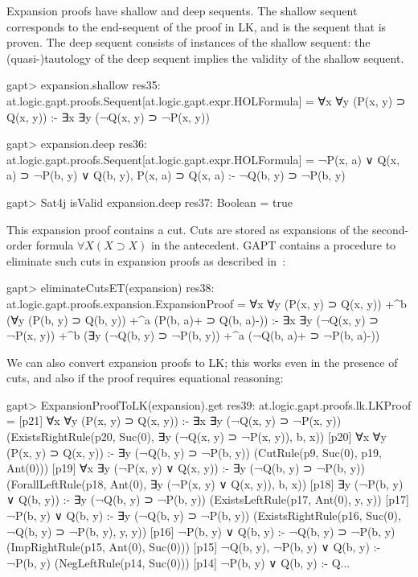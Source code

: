 \documentclass[a4paper,11pt]{article}
\newcommand{\impl}{\supset} %
\begin{document}
Expansion proofs have shallow and deep sequents.  The shallow sequent
corresponds to the end-sequent of the proof in LK, and is the sequent that is
proven.  The deep sequent consists of instances of the shallow sequent: the
(quasi-)tautology of the deep sequent implies the validity of the shallow
sequent.
\begin{clilisting}
gapt> expansion.shallow
res35: at.logic.gapt.proofs.Sequent[at.logic.gapt.expr.HOLFormula] = ∀x ∀y (P(x, y) ⊃ Q(x, y)) :- ∃x ∃y (¬Q(x, y) ⊃ ¬P(x, y))

gapt> expansion.deep
res36: at.logic.gapt.proofs.Sequent[at.logic.gapt.expr.HOLFormula] =
¬P(x, a) ∨ Q(x, a) ⊃ ¬P(b, y) ∨ Q(b, y),
P(x, a) ⊃ Q(x, a)
:-
¬Q(b, y) ⊃ ¬P(b, y)

gapt> Sat4j isValid expansion.deep
res37: Boolean = true

\end{clilisting}

This expansion proof contains a cut.  Cuts are stored as expansions of the
second-order formula $\forall X (X \impl X)$ in the antecedent.  GAPT contains
a procedure to eliminate such cuts in expansion proofs as described
in~\cite{Hetzl2013Expansion}:
\begin{clilisting}
gapt> eliminateCutsET(expansion)
res38: at.logic.gapt.proofs.expansion.ExpansionProof =
∀x ∀y (P(x, y) ⊃ Q(x, y))
  +^{b} (∀y (P(b, y) ⊃ Q(b, y)) +^{a} (P(b, a)+ ⊃ Q(b, a)-))
:-
∃x ∃y (¬Q(x, y) ⊃ ¬P(x, y))
  +^{b} (∃y (¬Q(b, y) ⊃ ¬P(b, y)) +^{a} (¬Q(b, a)+ ⊃ ¬P(b, a)-))

\end{clilisting}

We can also convert expansion proofs to LK; this works even in the presence of
cuts, and also if the proof requires equational reasoning:
\begin{clilisting}
gapt> ExpansionProofToLK(expansion).get
res39: at.logic.gapt.proofs.lk.LKProof =
[p21] ∀x ∀y (P(x, y) ⊃ Q(x, y)) :- ∃x ∃y (¬Q(x, y) ⊃ ¬P(x, y))    (ExistsRightRule(p20, Suc(0), ∃y (¬Q(x, y) ⊃ ¬P(x, y)), b, x))
[p20] ∀x ∀y (P(x, y) ⊃ Q(x, y)) :- ∃y (¬Q(b, y) ⊃ ¬P(b, y))    (CutRule(p9, Suc(0), p19, Ant(0)))
[p19] ∀x ∃y (¬P(x, y) ∨ Q(x, y)) :- ∃y (¬Q(b, y) ⊃ ¬P(b, y))    (ForallLeftRule(p18, Ant(0), ∃y (¬P(x, y) ∨ Q(x, y)), b, x))
[p18] ∃y (¬P(b, y) ∨ Q(b, y)) :- ∃y (¬Q(b, y) ⊃ ¬P(b, y))    (ExistsLeftRule(p17, Ant(0), y, y))
[p17] ¬P(b, y) ∨ Q(b, y) :- ∃y (¬Q(b, y) ⊃ ¬P(b, y))    (ExistsRightRule(p16, Suc(0), ¬Q(b, y) ⊃ ¬P(b, y), y, y))
[p16] ¬P(b, y) ∨ Q(b, y) :- ¬Q(b, y) ⊃ ¬P(b, y)    (ImpRightRule(p15, Ant(0), Suc(0)))
[p15] ¬Q(b, y), ¬P(b, y) ∨ Q(b, y) :- ¬P(b, y)    (NegLeftRule(p14, Suc(0)))
[p14] ¬P(b, y) ∨ Q(b, y) :- Q...
\end{clilisting}
\end{document}

